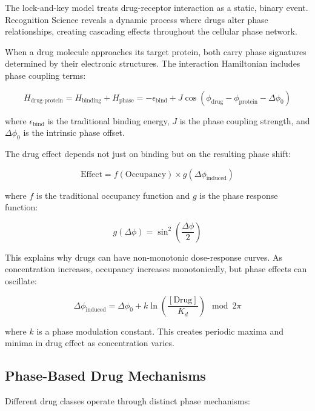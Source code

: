 \documentclass[12pt,a4paper]{report}
\begin{document}
The lock-and-key model treats drug-receptor interaction as a static, binary event. Recognition Science reveals a dynamic process where drugs alter phase relationships, creating cascading effects throughout the cellular phase network.

When a drug molecule approaches its target protein, both carry phase signatures determined by their electronic structures. The interaction Hamiltonian includes phase coupling terms:

\begin{equation}
H_{\text{drug-protein}} = H_{\text{binding}} + H_{\text{phase}} = -\epsilon_{\text{bind}} + J \cos(\phi_{\text{drug}} - \phi_{\text{protein}} - \Delta\phi_0)
\end{equation}

where $\epsilon_{\text{bind}}$ is the traditional binding energy, $J$ is the phase coupling strength, and $\Delta\phi_0$ is the intrinsic phase offset.

The drug effect depends not just on binding but on the resulting phase shift:

\begin{equation}
\text{Effect} = f(\text{Occupancy}) \times g(\Delta\phi_{\text{induced}})
\end{equation}

where $f$ is the traditional occupancy function and $g$ is the phase response function:

\begin{equation}
g(\Delta\phi) = \sin^2\left(\frac{\Delta\phi}{2}\right)
\end{equation}

This explains why drugs can have non-monotonic dose-response curves. As concentration increases, occupancy increases monotonically, but phase effects can oscillate:

\begin{equation}
\Delta\phi_{\text{induced}} = \Delta\phi_0 + k \ln\left(\frac{[\text{Drug}]}{K_d}\right) \mod 2\pi
\end{equation}

where $k$ is a phase modulation constant. This creates periodic maxima and minima in drug effect as concentration varies.

\subsection{Phase-Based Drug Mechanisms}

Different drug classes operate through distinct phase mechanisms:
\end{document}
